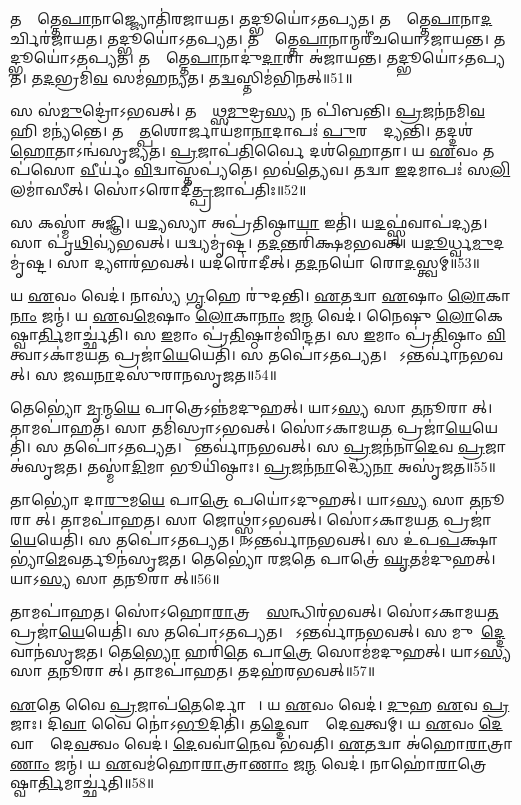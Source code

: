 𑌤𑌸𑍍𑌮𑌾᳚𑌤𑍍𑌤𑍇\ul{𑌪𑌾}𑌨𑌾𑌜𑍍𑌜𑍍𑌯𑍋𑌤𑌿॑𑌰𑌜𑌾𑌯𑌤।
𑌤𑌦𑍍𑌭𑍂𑌯𑍋॑\-𑌽𑌤𑌪𑍍𑌯𑌤।
𑌤𑌸𑍍𑌮𑌾᳚𑌤𑍍𑌤𑍇\ul{𑌪𑌾}𑌨𑌾\-\ul{𑌦}𑌰𑍍𑌚𑌿𑌰॑𑌜𑌾𑌯𑌤।
𑌤𑌦𑍍𑌭𑍂𑌯𑍋॑\-𑌽𑌤𑌪𑍍𑌯𑌤।
𑌤𑌸𑍍𑌮𑌾᳚𑌤𑍍𑌤𑍇\ul{𑌪𑌾}𑌨𑌾𑌨𑍍𑌮𑌰𑍀॑𑌚𑌯𑍋\-𑌽𑌜𑌾𑌯𑌨𑍍𑌤।
𑌤𑌦𑍍𑌭𑍂𑌯𑍋॑\-𑌽𑌤𑌪𑍍𑌯𑌤।
𑌤𑌸𑍍𑌮𑌾᳚𑌤𑍍𑌤𑍇\ul{𑌪𑌾}𑌨𑌾𑌦𑍁॑\ul{𑌦𑌾}𑌰𑌾 𑌅॑𑌜𑌾𑌯𑌨𑍍𑌤।
𑌤𑌦𑍍𑌭𑍂𑌯𑍋॑\-𑌽𑌤𑌪𑍍𑌯𑌤।
𑌤\ul{𑌦}𑌭𑍍𑌰𑌮𑌿॑\ul{𑌵} 𑌸𑌮॑𑌹𑌨𑍍𑌯𑌤।
𑌤\ul{𑌦𑍍𑌵}𑌸𑍍𑌤𑌿𑌮॑𑌭𑌿𑌨𑌤𑍍॥51॥

𑌸 𑌸॑\ul{𑌮𑍁}𑌦𑍍𑌰𑍋॑\-𑌽𑌭𑌵𑌤𑍍।
𑌤𑌸𑍍𑌮𑌾᳚𑌥𑍍𑌸\ul{𑌮𑍁}𑌦𑍍𑌰\ul{𑌸𑍍𑌯} 𑌨 𑌪𑌿॑𑌬𑌨𑍍𑌤𑌿।
\ul{𑌪𑍍𑌰}𑌜𑌨॑𑌨𑌮𑌿\ul{𑌵} 𑌹𑌿 𑌮𑌨𑍍𑌯॑𑌨𑍍𑌤𑍇।
𑌤𑌸𑍍𑌮𑌾᳚\ul{𑌤𑍍𑌪}𑌶𑍋𑌰𑍍𑌜𑌾𑌯॑𑌮𑌾\ul{𑌨𑌾}𑌦𑌾𑌪𑌃॑ \ul{𑌪𑍁}𑌰𑌸𑍍𑌤𑌾᳚𑌦𑍍𑌯𑌨𑍍𑌤𑌿।
𑌤𑌦𑍍𑌦𑌶॑\ul{𑌹𑍋}𑌤𑌾\-𑌽𑌨𑍍𑌵॑𑌸𑍃𑌜𑍍𑌯𑌤।
\ul{𑌪𑍍𑌰}𑌜𑌾𑌪॑\ul{𑌤𑌿}𑌰𑍍𑌵𑍈 𑌦𑌶॑𑌹𑍋𑌤𑌾।
𑌯 \ul{𑌏}𑌵𑌂 𑌤𑌪॑𑌸𑍋 \ul{𑌵𑍀}𑌰𑍍𑌯𑌂॑ \ul{𑌵𑌿}𑌦𑍍𑌵𑌾𑌸𑍍𑌤𑌪𑍍𑌯॑𑌤𑍇।
𑌭𑌵॑\ul{𑌤𑍍𑌯𑍇}𑌵।
𑌤𑌦𑍍𑌵𑌾 \ul{𑌇}𑌦𑌮𑌾𑌪𑌃॑ 𑌸\ul{𑌲𑌿}𑌲𑌮𑌾॑𑌸𑍀𑌤𑍍।
𑌸𑍋॑𑌽𑌰𑍋𑌦𑍀\ul{𑌤𑍍𑌪𑍍𑌰}𑌜𑌾𑌪॑𑌤𑌿𑌃॥52॥

𑌸 𑌕𑌸𑍍𑌮𑌾॑ 𑌅𑌜𑍍𑌞𑌿।
𑌯\ul{𑌦𑍍𑌯}𑌸𑍍𑌯𑌾 𑌅𑌪𑍍𑌰॑𑌤𑌿𑌷𑍍𑌠𑌾\ul{𑌯𑌾} 𑌇𑌤𑌿॑।
𑌯\ul{𑌦}𑌫𑍍𑌸𑍍𑌵॑𑌵𑌾𑌪॑𑌦𑍍𑌯𑌤।
𑌸𑌾 𑌪𑍃॑\ul{𑌥𑌿}𑌵𑍍𑌯॑𑌭𑌵𑌤𑍍।
𑌯𑌦𑍍𑌵𑍍𑌯𑌮𑍃॑𑌷𑍍𑌟।
𑌤\ul{𑌦}𑌨𑍍𑌤𑌰𑌿॑𑌕𑍍𑌷𑌮\-𑌭𑌵𑌤𑍍।
𑌯\ul{𑌦𑍂}𑌰𑍍𑌧𑍍𑌵\ul{𑌮𑍁}𑌦𑌮𑍃॑𑌷𑍍𑌟।
𑌸𑌾 𑌦𑍍𑌯𑍗𑌰॑𑌭𑌵𑌤𑍍।
𑌯𑌦𑌰𑍋॑𑌦𑍀𑌤𑍍।
𑌤\ul{𑌦}𑌨𑌯𑍋॑ 𑌰𑍋\ul{𑌦}𑌸𑍍𑌤𑍍𑌵𑌮𑍍॥53॥

𑌯 \ul{𑌏}𑌵𑌂 𑌵𑍇𑌦॑।
𑌨𑌾𑌸𑍍𑌯॑ \ul{𑌗𑍃}𑌹𑍇 𑌰𑍁॑𑌦𑌨𑍍𑌤𑌿।
\ul{𑌏}𑌤𑌦𑍍𑌵𑌾 \ul{𑌏}𑌷𑌾𑌂 \ul{𑌲𑍋}𑌕𑌾\ul{𑌨𑌾𑌂} 𑌜𑌨𑍍𑌮॑।
𑌯 \ul{𑌏}𑌵\ul{𑌮𑍇}𑌷𑌾𑌂 \ul{𑌲𑍋}𑌕𑌾\ul{𑌨𑌾𑌂} 𑌜\ul{𑌨𑍍𑌮} 𑌵𑍇𑌦॑।
𑌨𑍈𑌷𑍁 \ul{𑌲𑍋}𑌕𑍇𑌷𑍍𑌵𑌾\ul{𑌰𑍍𑌤𑌿}𑌮𑌾𑌰𑍍𑌚𑍍𑌛॑𑌤𑌿।
𑌸 \ul{𑌇}𑌮𑌾𑌂 𑌪𑍍𑌰॑\ul{𑌤𑌿}𑌷𑍍𑌠𑌾𑌮॑𑌵𑌿𑌨𑍍𑌦𑌤।
𑌸 \ul{𑌇}𑌮𑌾𑌂 𑌪𑍍𑌰॑\ul{𑌤𑌿}𑌷𑍍𑌠𑌾𑌂 \ul{𑌵𑌿}𑌤𑍍𑌵𑌾\-𑌽𑌕𑌾॑𑌮𑌯\ul{𑌤} 𑌪𑍍𑌰𑌜𑌾॑\ul{𑌯𑍇}𑌯𑍇𑌤𑌿॑।
𑌸 𑌤𑌪𑍋॑\-𑌽𑌤𑌪𑍍𑌯𑌤।
𑌸𑍋᳚𑌽𑌨𑍍𑌤𑌰𑍍𑌵𑌾॑𑌨𑌭𑌵𑌤𑍍।
𑌸 \ul{𑌜}𑌘\ul{𑌨𑌾}𑌦𑌸𑍁॑𑌰𑌾𑌨𑌸𑍃𑌜𑌤॥54॥

𑌤𑍇𑌭𑍍𑌯𑍋॑ \ul{𑌮𑍃}𑌨𑍍𑌮\ul{𑌯𑍇} 𑌪𑌾𑌤𑍍𑌰𑍇\-𑌽𑌨𑍍𑌨॑𑌮𑌦𑍁𑌹𑌤𑍍।
𑌯𑌾𑌽\ul{𑌸𑍍𑌯} 𑌸𑌾 \ul{𑌤}𑌨𑍂𑌰𑌾𑌸𑍀᳚𑌤𑍍।
𑌤𑌾𑌮𑌪𑌾॑𑌹𑌤।
𑌸𑌾 𑌤𑌮𑌿॑𑌸𑍍𑌰𑌾\-𑌽𑌭𑌵𑌤𑍍।
𑌸𑍋॑𑌽𑌕𑌾𑌮𑌯\ul{𑌤} 𑌪𑍍𑌰𑌜𑌾॑\ul{𑌯𑍇}𑌯𑍇𑌤𑌿॑।
𑌸 𑌤𑌪𑍋॑\-𑌽𑌤𑌪𑍍𑌯𑌤।
𑌸𑍋᳚𑌨𑍍𑌤𑌰𑍍𑌵𑌾॑𑌨𑌭𑌵𑌤𑍍।
𑌸 \ul{𑌪𑍍𑌰}𑌜𑌨॑𑌨𑌾\ul{𑌦𑍇}𑌵 \ul{𑌪𑍍𑌰}𑌜𑌾 𑌅॑𑌸𑍃𑌜𑌤।
𑌤𑌸𑍍𑌮𑌾॑\ul{𑌦𑌿}𑌮𑌾 𑌭𑍂𑌯𑌿॑𑌷𑍍𑌠𑌾𑌃।
\ul{𑌪𑍍𑌰}𑌜𑌨॑\ul{𑌨𑌾}𑌦𑍍𑌧𑍍𑌯𑍇॑\ul{𑌨𑌾} 𑌅𑌸𑍃॑𑌜𑌤॥55॥

𑌤𑌾𑌭𑍍𑌯𑍋॑ 𑌦𑌾\ul{𑌰𑍁}𑌮\ul{𑌯𑍇} 𑌪𑌾\ul{𑌤𑍍𑌰𑍇} 𑌪𑌯𑍋॑\-𑌽𑌦𑍁𑌹𑌤𑍍।
𑌯𑌾𑌽\ul{𑌸𑍍𑌯} 𑌸𑌾 \ul{𑌤}𑌨𑍂𑌰𑌾𑌸𑍀᳚𑌤𑍍।
𑌤𑌾𑌮𑌪𑌾॑𑌹𑌤।
𑌸𑌾 𑌜𑍋𑌥𑍍𑌸𑍍𑌨𑌾॑\-𑌽𑌭𑌵𑌤𑍍।
𑌸𑍋॑𑌽𑌕𑌾𑌮𑌯\ul{𑌤} 𑌪𑍍𑌰𑌜𑌾॑\ul{𑌯𑍇}𑌯𑍇𑌤𑌿॑।
𑌸 𑌤𑌪𑍋॑\-𑌽𑌤𑌪𑍍𑌯𑌤।
𑌸𑍋᳚𑌽𑌨𑍍𑌤𑌰𑍍𑌵𑌾॑𑌨𑌭𑌵𑌤𑍍।
𑌸 𑌉॑𑌪\ul{𑌪}𑌕𑍍𑌷𑌾𑌭𑍍𑌯𑌾॑\ul{𑌮𑍇}𑌵𑌰𑍍𑌤𑍂𑌨॑𑌸𑍃𑌜𑌤।
𑌤𑍇𑌭𑍍𑌯𑍋॑ 𑌰\ul{𑌜}𑌤𑍇 𑌪𑌾𑌤𑍍𑌰𑍇॑ \ul{𑌘𑍃}𑌤𑌮॑𑌦𑍁𑌹𑌤𑍍।
𑌯𑌾𑌽\ul{𑌸𑍍𑌯} 𑌸𑌾 \ul{𑌤}𑌨𑍂𑌰𑌾𑌸𑍀᳚𑌤𑍍॥56॥

𑌤𑌾𑌮𑌪𑌾॑𑌹𑌤।
𑌸𑍋॑𑌽𑌹𑍋\ul{𑌰𑌾}𑌤𑍍𑌰𑌯𑍋𑌃᳚ \ul{𑌸}𑌨𑍍𑌧𑌿𑌰॑𑌭𑌵𑌤𑍍।
𑌸𑍋॑𑌽𑌕𑌾𑌮𑌯\ul{𑌤} 𑌪𑍍𑌰𑌜𑌾॑\ul{𑌯𑍇}𑌯𑍇𑌤𑌿॑।
𑌸 𑌤𑌪𑍋॑\-𑌽𑌤𑌪𑍍𑌯𑌤।
𑌸𑍋᳚𑌽𑌨𑍍𑌤𑌰𑍍𑌵𑌾॑𑌨𑌭𑌵𑌤𑍍।
𑌸 𑌮𑍁𑌖𑌾᳚\ul{𑌦𑍍𑌦𑍇}𑌵𑌾𑌨॑𑌸𑍃𑌜𑌤।
𑌤𑍇\ul{𑌭𑍍𑌯𑍋} 𑌹𑌰𑌿॑\ul{𑌤𑍇} 𑌪𑌾\ul{𑌤𑍍𑌰𑍇} 𑌸𑍋𑌮॑𑌮𑌦𑍁𑌹𑌤𑍍।
𑌯𑌾𑌽\ul{𑌸𑍍𑌯} 𑌸𑌾 \ul{𑌤}𑌨𑍂𑌰𑌾𑌸𑍀᳚𑌤𑍍।
𑌤𑌾𑌮𑌪𑌾॑𑌹𑌤।
𑌤𑌦𑌹॑𑌰𑌭𑌵𑌤𑍍॥57॥

\ul{𑌏}𑌤𑍇 𑌵𑍈 \ul{𑌪𑍍𑌰}𑌜𑌾𑌪॑\ul{𑌤𑍇}𑌰𑍍𑌦𑍋𑌹𑌾𑌃᳚।
𑌯 \ul{𑌏}𑌵𑌂 𑌵𑍇𑌦॑।
\ul{𑌦𑍁}𑌹 \ul{𑌏}𑌵 \ul{𑌪𑍍𑌰}𑌜𑌾𑌃।
𑌦𑌿\ul{𑌵𑌾} 𑌵𑍈 𑌨𑍋॑\-𑌽\ul{𑌭𑍂}𑌦𑌿𑌤𑌿॑।
𑌤\ul{𑌦𑍍𑌦𑍇}𑌵𑌾𑌨𑌾𑌂᳚ 𑌦𑍇\ul{𑌵}𑌤𑍍𑌵𑌮𑍍।
𑌯 \ul{𑌏}𑌵𑌂 \ul{𑌦𑍇}𑌵𑌾𑌨𑌾𑌂᳚ 𑌦𑍇\ul{𑌵}𑌤𑍍𑌵𑌂 𑌵𑍇𑌦॑।
\ul{𑌦𑍇}𑌵𑌵𑌾॑\ul{𑌨𑍇}𑌵 𑌭॑𑌵𑌤𑌿।
\ul{𑌏}𑌤𑌦𑍍𑌵𑌾 𑌅॑𑌹𑍋\ul{𑌰𑌾}𑌤𑍍𑌰𑌾\ul{𑌣𑌾𑌂} 𑌜𑌨𑍍𑌮॑।
𑌯 \ul{𑌏}𑌵𑌮॑𑌹𑍋\ul{𑌰𑌾}𑌤𑍍𑌰𑌾\ul{𑌣𑌾𑌂} 𑌜\ul{𑌨𑍍𑌮} 𑌵𑍇𑌦॑।
𑌨𑌾𑌹𑍋॑\ul{𑌰𑌾}𑌤𑍍𑌰𑍇𑌷𑍍𑌵𑌾\ul{𑌰𑍍𑌤𑌿}𑌮𑌾𑌰𑍍𑌚𑍍𑌛॑𑌤𑌿॥58॥

